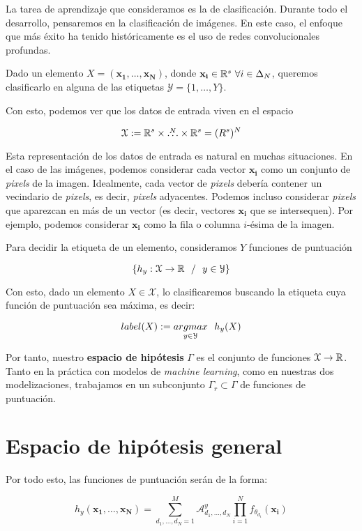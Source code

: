 La tarea de aprendizaje que consideramos es la de clasificación. Durante todo el desarrollo, pensaremos en la clasificación de imágenes. En este caso, el enfoque que más éxito ha tenido históricamente es el uso de redes convolucionales profundas.

Dado un elemento $X = (\mathbf{x_1}, \ldots, \mathbf{x_N})$, donde $\mathbf{x_i} \in \mathbb{R}^s \ \forall i \in \Delta_{N}$, queremos clasificarlo en alguna de las etiquetas $\mathcal{Y} = \{1, \ldots, Y \}$.

Con esto, podemos ver que los datos de entrada viven en el espacio

$$\mathcal{X} := \mathbb{R}^s \times \overset{N}{\ldots} \times \mathbb{R}^s = (R^s)^N$$

Esta representación de los datos de entrada es natural en muchas situaciones. En el caso de las imágenes, podemos considerar cada vector $\mathbf{x_i}$ como un conjunto de \textit{pixels} de la imagen. Idealmente, cada vector de \textit{pixels} debería contener un vecindario de \textit{pixels}, es decir, \textit{pixels} adyacentes. Podemos incluso considerar \textit{pixels} que aparezcan en más de un vector (es decir, vectores $\mathbf{x_i}$ que se intersequen). Por ejemplo, podemos considerar $\mathbf{x_i}$ como la fila o columna $i$-ésima de la imagen.

Para decidir la etiqueta de un elemento, consideramos $Y$ funciones de puntuación

$$\{h_y: \mathcal{X} \to \mathbb{R} \ \  / \ \  y \in \mathcal{Y} \}$$

Con esto, dado un elemento $X \in \mathcal{X}$, lo clasificaremos buscando la etiqueta cuya función de puntuación sea máxima, es decir:

$$label(X) := \underset{y \in \mathcal{Y}}{argmax} \ \  h_y(X)$$

Por tanto, nuestro \textbf{espacio de hipótesis} $\Gamma$ es el conjunto de funciones $\mathcal{X} \to \mathbb{R}$. Tanto en la práctica con modelos de \textit{machine learning}, como en nuestras dos modelizaciones, trabajamos en un subconjunto $\Gamma_r \subset \Gamma$ de funciones de puntuación.

\section{Espacio de hipótesis general}


Por todo esto, las funciones de puntuación serán de la forma:

\begin{equation} \label{eq:puntuacion_general}
    h_y(\mathbf{x_1}, \ldots, \mathbf{x_N}) = \sum_{d_1, \ldots, d_N = 1}^{M} \mathcal{A}^y_{d_1, \ldots, d_N} \prod_{i = 1}^N f_{\theta_{d_i}}(\mathbf{x_i})
\end{equation}

\endinput
